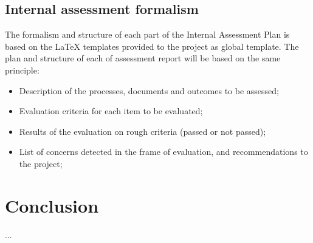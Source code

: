\documentclass{template/openetcs_article}
\begin{document}
\subsection{Internal assessment formalism}
The formalism and structure of each part of the Internal Assessment Plan is based on the LaTeX templates provided to the project as global template.
The plan and structure of each of assessment report will be based on the same principle:
 \begin{itemize}
\item Description of the processes, documents and outcomes to be assessed;
\item Evaluation criteria for each item to be evaluated;
\item Results of the evaluation on rough criteria (passed or not passed);
\item List of concerns detected in the frame of evaluation, and recommendations to the project;
\end{itemize}

\section{Conclusion}
...


\nocite{*} 






\end{document}
